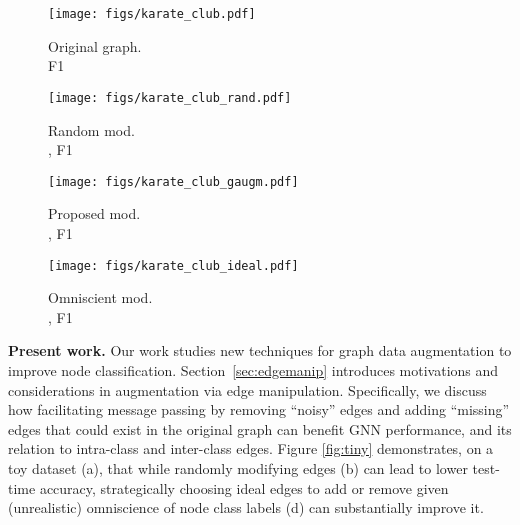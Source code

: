\documentclass[letterpaper]{article} \usepackage{aaai21}  \usepackage{times}  \usepackage{helvet} \usepackage{courier}  \usepackage[hyphens]{url}  \usepackage{graphicx} \urlstyle{rm} \def\UrlFont{\rm}  \usepackage{natbib}  \usepackage{caption} \frenchspacing  \setlength{\pdfpagewidth}{8.5in}  \setlength{\pdfpageheight}{11in}
\begin{document}
\begin{figure*}[t]
    \centering
        \begin{subfigure}[b]{.2\linewidth}
         \texttt{[image: figs/karate\_club.pdf]}  
         \caption{Original graph. \\  F1}\label{fig:tiny_orig}
        \end{subfigure}\quad
        \begin{subfigure}[b]{.2\linewidth}
         \texttt{[image: figs/karate\_club\_rand.pdf]}
            \caption{Random mod.\\ ,  F1}\label{fig:tiny_rand}
        \end{subfigure}\quad
        \begin{subfigure}[b]{.2\linewidth}
         \texttt{[image: figs/karate\_club\_gaugm.pdf]}
            \caption{Proposed \methodshared mod.\\ ,  F1}\label{fig:tiny_gaugm}
        \end{subfigure}\quad
        \begin{subfigure}[b]{.2\linewidth}
         \texttt{[image: figs/karate\_club\_ideal.pdf]}
            \caption{Omniscient mod.\\ ,  F1}\label{fig:tiny_ideal}
        \end{subfigure}
        \caption{\label{fig:tiny} \gcn performance (test micro-F1) on the original Zachary's Karate Club graph in (a), and three augmented graph variants in (b-d), evaluated on both original () and modified () graph settings. Black, solid-blue, dashed-blue edges denote original graph connectivity, newly added, and removed edges respectively.  While random graph modification (b) hurts performance, our proposed \methodshared augmentation approaches (c) demonstrate significant relative performance improvements, narrowing the gap to omniscient, class-aware modifications (d).}
\end{figure*}

\noindent \textbf{Present work.} Our work studies new techniques for graph data augmentation to improve node classification.  Section~\ref{sec:edgemanip} introduces motivations and considerations in augmentation via edge manipulation.  Specifically, we discuss how facilitating message passing by removing ``noisy'' edges and adding ``missing'' edges that could exist in the original graph can benefit GNN performance, and its relation to intra-class and inter-class edges.  Figure \ref{fig:tiny} demonstrates, on a toy dataset (a), that while randomly modifying edges (b) can lead to lower test-time accuracy,  strategically choosing ideal edges to add or remove given (unrealistic) omniscience of node class labels (d) can substantially improve it.
\end{document}
